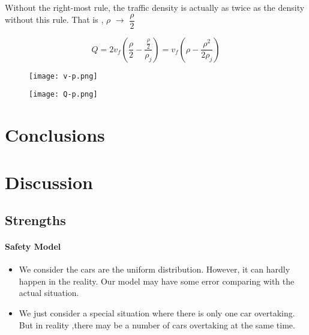 Without the right-most rule, the traffic density
is actually as twice as the density without this
rule.
That is , $\rho$ $\rightarrow$ $\dfrac{\rho}{2}$

\begin{displaymath}
Q = 2v_f(\dfrac{\rho}{2} -\dfrac{\frac{\rho}{2}}{\rho_j})
= v_f(\rho - \dfrac{\rho^2}{2\rho _j})
\end{displaymath}

\begin{figure}[htbp]
\centering
\begin{minipage}{60pt}
\centering
	\texttt{[image: v-p.png]}
\end{minipage}
\hspace{10pt}
\begin{minipage}{60pt}
\centering
	\texttt{[image: Q-p.png]}
\end{minipage}
\end{figure}



\section{Conclusions}




\section{Discussion}

\subsection{Strengths}

\paragraph{Safety Model}

\begin{itemize}
\item We consider the cars are the uniform distribution. However, it can hardly happen in the reality. Our model may have some error comparing with the actual situation.
\item We just consider a special situation where there is only one car overtaking. But in reality ,there may be a number of cars overtaking at the same time.
\end{itemize}

